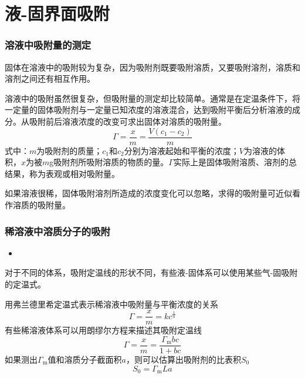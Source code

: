 \section{液-固界面吸附}


\begin{frame}
    \frametitle{溶液中吸附量的测定}

    固体在溶液中的吸附较为复杂，因为吸附剂既要吸附溶质，又要吸附溶剂，溶质和溶剂之间还有相互作用。
    
    溶液中的吸附虽然很复杂，但吸附量的测定却比较简单。通常是在定温条件下，将一定量的固体吸附剂与一定量已知浓度的溶液混合，达到吸附平衡后分析溶液的成分。从吸附前后溶液浓度的改变可求出固体对溶质的吸附量。
    \[
        \varGamma = \frac{x}{m} = \frac{V(c_1 - c_2)}{m}
    \]
    式中：$m$为吸附剂的质量；$c_1$和$c_2$分别为溶液起始和平衡的浓度；$V$为溶液的体积，$x$为被$m$g吸附剂所吸附溶质的物质的量。$\varGamma$实际上是固体吸附溶质、溶剂的总结果，称为表观或相对吸附量。 
    
    如果溶液很稀，固体吸附溶剂所造成的浓度变化可以忽略，求得的吸附量可近似看作溶质的吸附量。

\end{frame}


\begin{frame}
    \frametitle{稀溶液中溶质分子的吸附}

    \begin{itemize}
        \item[1.] 
    \end{itemize}
    对于不同的体系，吸附定温线的形状不同，有些液-固体系可以使用某些气-固吸附的定温式。
    
    用弗兰德里希定温式表示稀溶液中吸附量与平衡浓度的关系
    \[
        \varGamma = \frac{x}{m} = kc^{\frac{1}{n}}
    \]
    有些稀溶液体系可以用朗缪尔方程来描述其吸附定温线
    \[
        \varGamma = \frac{x}{m} = \frac{\varGamma_\mathrm{m} bc}{1 + bc}
    \]
    如果测出$\varGamma_\mathrm{m}$值和溶质分子截面积$a$，则可以估算出吸附剂的比表积$S_0$
    \[
        S_0 = \varGamma_\mathrm{m} La
    \]

\end{frame}


